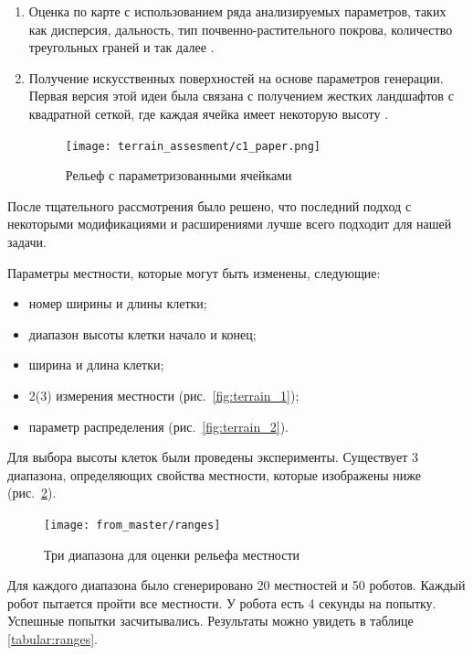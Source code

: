 \begin{enumerate}
    \item Оценка по карте с использованием ряда анализируемых параметров, таких как дисперсия, дальность, тип почвенно-растительного покрова, количество треугольных граней и так далее \cite{hung_Advanced_2004}.
    \item Получение искусственных поверхностей на основе параметров генерации. Первая версия этой идеи была связана с получением жестких ландшафтов с квадратной сеткой, где каждая ячейка имеет некоторую высоту \cite{sancho-pradel_Survey_2010} .
          
          \begin{figure}[H]
              \centering\texttt{[image: terrain\_assesment/c1\_paper.png]}
              \caption{Рельеф с параметризованными ячейками}
              \label{fig:terrain_assesment/c1_paper.png}
          \end{figure}
\end{enumerate}

После тщательного рассмотрения было решено, что последний подход с некоторыми модификациями и расширениями лучше всего подходит для нашей задачи.

Параметры местности, которые могут быть изменены, следующие:
\begin{itemize}
\item номер ширины и длины клетки;
\item диапазон высоты клетки начало и конец;
\item ширина и длина клетки;
\item 2(3) измерения местности (рис.~\ref{fig:terrain_1});
\item параметр распределения (рис.~\ref{fig:terrain_2}).
\end{itemize}

Для выбора высоты клеток были проведены эксперименты.
Существует 3 диапазона, определяющих свойства местности, которые изображены ниже (рис.~\ref{fig:range}).

\begin{figure}[H]
\centering\texttt{[image: from\_master/ranges]}\\
\caption{Три диапазона для оценки рельефа местности}
\label{fig:range}
\end{figure}

Для каждого диапазона было сгенерировано 20 местностей и 50 роботов. Каждый робот пытается пройти все местности. У робота есть 4 секунды на попытку. Успешные попытки засчитывались. Результаты можно увидеть в таблице \ref{tabular:ranges}.

